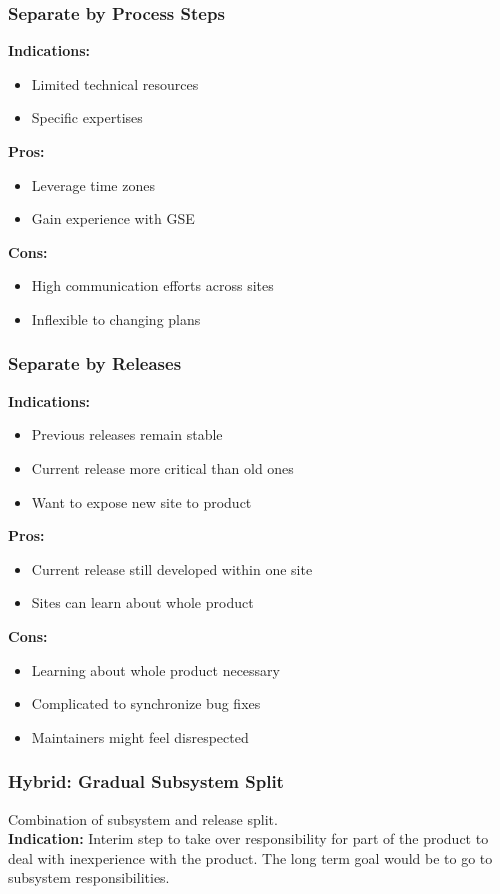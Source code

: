 \subsubsection{Separate by Process Steps}
\textbf{Indications:}
\begin{itemize}[itemsep=0pt]
  \item Limited technical resources
  \item Specific expertises
\end{itemize}
\textbf{Pros:}
\begin{itemize}[itemsep=0pt]
  \item Leverage time zones
  \item Gain experience with GSE
\end{itemize}
\textbf{Cons:}
\begin{itemize}[itemsep=0pt]
  \item High communication efforts across sites
  \item Inflexible to changing plans
\end{itemize}

\subsubsection{Separate by Releases}
\textbf{Indications:}
\begin{itemize}[itemsep=0pt]
  \item Previous releases remain stable
  \item Current release more critical than old ones
  \item Want to expose new site to product
\end{itemize}
\textbf{Pros:}
\begin{itemize}[itemsep=0pt]
  \item Current release still developed within one site
  \item Sites can learn about whole product
\end{itemize}
\textbf{Cons:}
\begin{itemize}[itemsep=0pt]
  \item Learning about whole product necessary
  \item Complicated to synchronize bug fixes
  \item Maintainers might feel disrespected
\end{itemize}

\subsubsection{Hybrid: Gradual Subsystem Split}
Combination of subsystem and release split.\\
\textbf{Indication:}
Interim step to take over responsibility for part of the product to deal with inexperience with the product. The long term goal would be to go to subsystem responsibilities.

